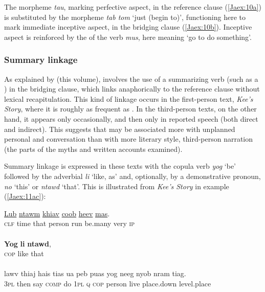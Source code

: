 \documentclass[output=paper]{LSP/langsci}
\begin{document}
\noindent
The morpheme \textit{tau}, marking perfective aspect, in the reference clause (\ref{Jaex:10a}) is substituted by the morpheme \textit{tab tom} `just (begin to)', functioning here to mark immediate inceptive aspect, in the bridging clause (\ref{Jaex:10b}). Inceptive aspect is reinforced by the  of the verb \textit{mus}, here meaning `go to do something'.
 
\subsubsection{Summary linkage}
\label{JaSummar}
As explained by \citeauthor{guerin18} (this volume),  involves the use of a summarizing verb (such as a ) in the bridging clause, which links anaphorically to the reference clause without lexical recapitulation. This kind of linkage occurs in the first-person text, \textit{Kee’s Story}, where it is roughly as frequent as . In the third-person texts, on the other hand, it appears only occasionally, and then only in reported speech (both direct and indirect). This suggests that  may be associated more with unplanned personal  and conversation than with more literary style, third-person narration (the  parts of the myths and written accounts examined).
 
Summary linkage is expressed in these texts with the copula verb \textit{yog} `be' followed by the adverbial \textit{li} `like, as' and, optionally, by a demonstrative pronoun, \textit{no} `this' or \textit{ntawd} `that'. This is illustrated from \textit{Kee’s Story} in example (\ref{Jaex:11ac}):
 
\begin{exe}
\ex \label{Jaex:11ac}
\begin{xlist}
\ex \label{Jaex:11a}
\gll \underline{Lub} \underline{} \underline{ntawm} \underline{} \underline{khiav} \underline{coob}     \underline{heev} \underline{mas}.        \\
\textsc{clf} time that person run be.many very \textsc{ip}\\
\glt {}\\
\ex \label{Jaex:11b}
\gll   \textbf{Yog} \textbf{li} \textbf{ntawd},\\
\textsc{cop} like that\\
\glt {}\\
\ex \label{Jaex:11c}
\gll lawv  thiaj hais tias ua  peb puas yog neeg nyob nram   tiag.\\     	      
     \textsc{3pl} then say \textsc{comp} do \textsc{1pl} \textsc{q} \textsc{cop} person live place.down level.place\\
\glt {} \citep[][227]{fuller85}
\end{xlist}
\end{exe}
\end{document}
